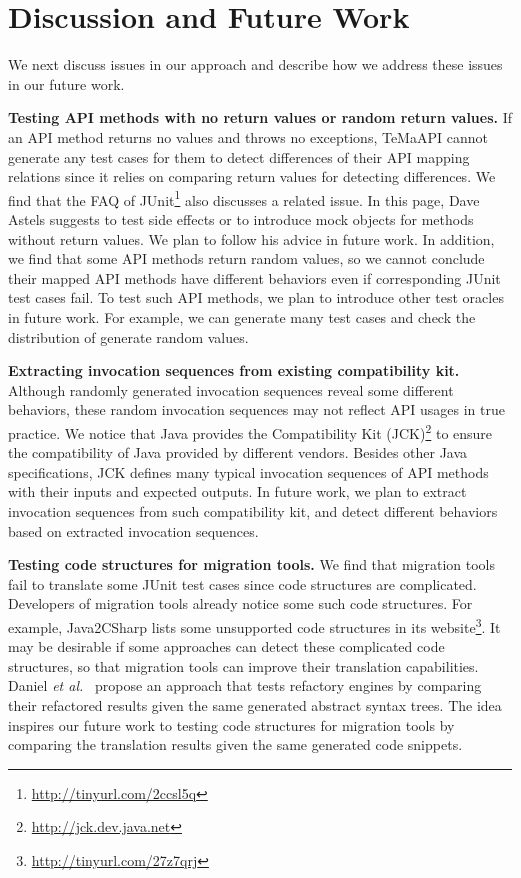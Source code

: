 

\section{Discussion and Future Work}
\label{sec:discuss}

We next discuss issues in our approach and describe how we address
these issues in our future work.

\textbf{Testing API methods with no return values or random return values.} If an API method returns no values and throws no exceptions, TeMaAPI cannot generate any test cases for them to detect differences of their API mapping relations since it relies on comparing return values for detecting differences. We find that the FAQ of JUnit\footnote{\url{http://tinyurl.com/2ccsl5q}} also discusses a related issue. In this page, Dave Astels suggests to test side effects or to introduce mock objects for methods without return values. We plan to follow his advice in future work. In addition, we find that some API methods return random values, so we cannot conclude their mapped API methods have different behaviors even if corresponding JUnit test cases fail. To test such API methods, we plan to introduce other test oracles in future work. For example, we can generate many test cases and check the distribution of generate random values.

\textbf{Extracting invocation sequences from existing compatibility kit.} Although randomly generated invocation sequences reveal some different behaviors, these random invocation sequences may not reflect API usages in true practice. We notice that Java provides the Compatibility Kit (JCK)\footnote{\url{http://jck.dev.java.net}} to ensure the compatibility of Java provided by different vendors. Besides other Java specifications, JCK  defines many typical invocation sequences of API methods with their inputs and expected outputs. In future work, we plan to extract invocation sequences from such compatibility kit, and detect different behaviors based on extracted invocation sequences.

\textbf{Testing code structures for migration tools.} We find that migration tools fail to translate some JUnit test cases since code structures are complicated. Developers of migration tools already notice some such code structures. For example, Java2CSharp lists some unsupported code structures in its website\footnote{\url{http://tinyurl.com/27z7qrj}}. It may be desirable if some approaches can detect these complicated code structures, so that migration tools can improve their translation capabilities. Daniel \emph{et al.}~\cite{daniel2007automated} propose an approach that tests refactory engines by comparing their refactored results given the same generated abstract syntax trees. The idea inspires our future work to testing code structures for migration tools by comparing the translation results given the same generated code snippets. 
